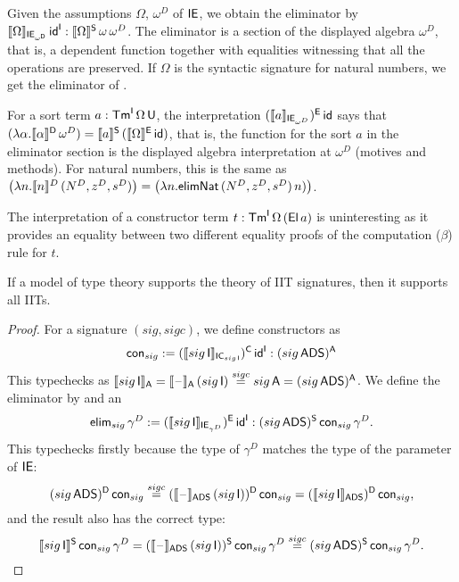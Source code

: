 \documentclass[a4paper,UKenglish,cleveref, autoref]{lipics-v2019}
\begin{document}
\begin{example}
  Given the assumptions $\Omega$, $\omega^D$ of $\mathsf{IE}$, we obtain the
  eliminator by
  $\llbracket\Omega\rrbracket_{\mathsf{IE}_{\omega^{\mathsf{D}}}}\,\mathsf{id}^{\mathsf{I}} :
  \llbracket\Omega\rrbracket^{\mathsf{S}}\,\omega\,\omega^D$. The eliminator is a section of
  the displayed algebra $\omega^D$, that is, a dependent function
  together with equalities witnessing that all the operations are
  preserved. If $\Omega$ is the syntactic signature for natural
  numbers, we get the eliminator of .

  For a sort term $a:\mathsf{Tm}^{\mathsf{I}}\,\Omega\,\mathsf{U}$, the interpretation
  $(\llbracket a\rrbracket_{\mathsf{IE}_{\omega^D}})^{\mathsf{E}}\,\mathsf{id}$ says that
  $(\lambda\alpha.\llbracket\alpha\rrbracket^{\mathsf{D}}\,\omega^D) = \llbracket
  a\rrbracket^{\mathsf{S}}\,(\llbracket\Omega\rrbracket^{\mathsf{E}}\,\mathsf{id})$, that is, the function for the sort
  $a$ in the eliminator section is the displayed algebra
  interpretation at $\omega^D$ (motives and methods). For natural
  numbers, this is the same as
  $\big(\lambda n.\llbracket n\rrbracket^D\,(N^D,z^D,s^D)\big) = \big(\lambda
  n.\mathsf{elimNat}\,(N^D,z^D,s^D)\,n)\big)$.

  The interpretation of a constructor term
  $t:\mathsf{Tm}^{\mathsf{I}}\,\Omega\,(\mathsf{El}\,a)$ is uninteresting as it provides an
  equality between two different equality proofs of the computation
  ($\beta$) rule for $t$.
\end{example}

\begin{theorem}\label{th:tosToIITs}
  If a model of type theory supports the theory of IIT signatures,
  then it supports all IITs.
\end{theorem}
\begin{proof}
  For a signature $({sig},{sigc})$, we define constructors as
  \[
    \mathsf{con}_{sig}:= (\llbracket{sig}\,\mathsf{I}\rrbracket_{\mathsf{IC}_{{sig}\,\mathsf{I}}})^{\mathsf{C}}\,\mathsf{id}^{\mathsf{I}} : ({sig}\,\mathsf{ADS})^{\mathsf{A}}
  \]
  This typechecks as
  $\llbracket{sig}\,\mathsf{I}\rrbracket_{\mathsf{A}} = \llbracket\mathord{\hspace{1pt}\text{--}\hspace{1pt}}\rrbracket_{\mathsf{A}}\,({sig}\,\mathsf{I})
  \overset{{sigc}}{=} {{sig}\,\mathsf{A}} = ({sig}\,\mathsf{ADS})^{\mathsf{A}}$. We define the
  eliminator by
  and an
  \[
    \mathsf{elim}_{sig}\,\gamma^D := (\llbracket{sig}\,\mathsf{I}\rrbracket_{\mathsf{IE}_{\gamma^D}})^{\mathsf{E}}\,\mathsf{id}^{\mathsf{I}}  : ({sig}\,\mathsf{ADS})^{\mathsf{S}}\,\mathsf{con}_{sig}\,\gamma^D.
  \]
  This typechecks firstly because the type of $\gamma^D$ matches the
  type of the parameter of $\mathsf{IE}$:
  \[
    ({sig}\,\mathsf{ADS})^{\mathsf{D}}\,\mathsf{con}_{sig} \overset{{sigc}}{=}
    (\llbracket\mathord{\hspace{1pt}\text{--}\hspace{1pt}}\rrbracket_{\mathsf{ADS}}\,({sig}\,\mathsf{I}))^{\mathsf{D}}\,\mathsf{con}_{sig} =
    (\llbracket{sig}\,\mathsf{I}\rrbracket_{\mathsf{ADS}})^{\mathsf{D}}\,\mathsf{con}_{sig},
  \]
  and the result also has the correct type:
  \[
    \llbracket{sig}\,\mathsf{I}\rrbracket^{\mathsf{S}}\,\mathsf{con}_{sig}\,\gamma^D = (\llbracket\mathord{\hspace{1pt}\text{--}\hspace{1pt}}\rrbracket_{\mathsf{ADS}}\,({sig}\,\mathsf{I}))^{\mathsf{S}}\,\mathsf{con}_{sig}\,\gamma^D \overset{{sigc}}{=} ({sig}\,\mathsf{ADS})^{\mathsf{S}}\,\mathsf{con}_{sig}\,\gamma^D.
  \]
\end{proof}
\end{document}
